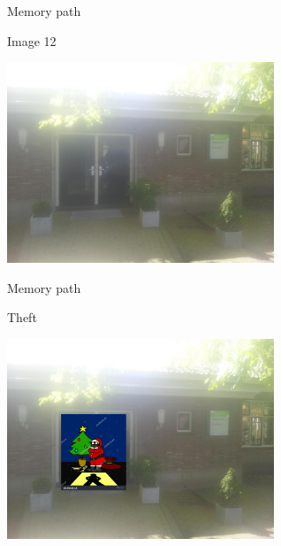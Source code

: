 \begin{frame}{Memory path}
  \begin{block}{Image 12}
    \begin{center}
      \includegraphics[height=6cm]{img/loci/12.jpg}
    \end{center}
  \end{block}
\end{frame}
\begin{frame}{Memory path}
  \begin{block}{Theft}
    \begin{center}
      \includegraphics[height=6cm]{img/loci/12-theft.jpg}
    \end{center}
  \end{block}
\end{frame}

